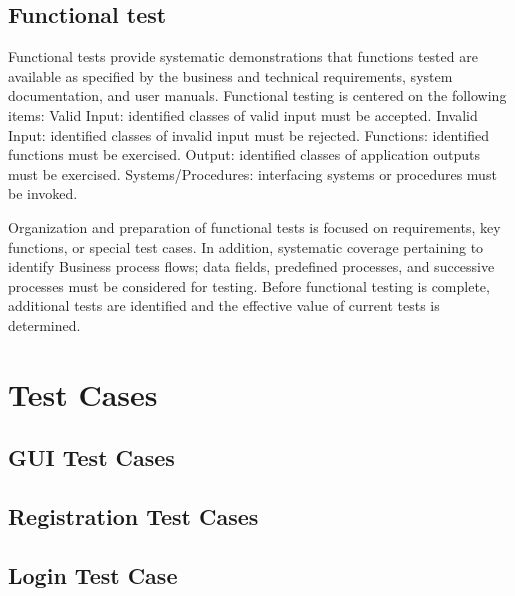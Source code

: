 \documentclass[12pt]{report}
\begin{document}
\subsection{ Functional test}
\justifying
\setlength{\parindent}{4em}
\setlength{\parskip}{0.5em}
\renewcommand{\baselinestretch}{1.5}
\normalsize

Functional tests provide systematic demonstrations that functions tested are available as 
specified by the business and technical requirements, system documentation, and user 
manuals. Functional testing is centered on the following items: Valid Input: identified classes 
of valid input must be accepted. Invalid Input: identified classes of invalid input must be 
rejected. Functions: identified functions must be exercised. Output: identified classes of 
application outputs must be exercised. Systems/Procedures: interfacing systems or procedures 
must be invoked.

Organization and preparation of functional tests is focused on requirements, key functions, or 
special test cases. In addition, systematic coverage pertaining to identify Business process 
flows; data fields, predefined processes, and successive processes must be considered for 
testing. Before functional testing is complete, additional tests are identified and the effective 
value of current tests is determined.




\clearpage


\centering
\section{Test Cases}
\justifying
\setlength{\parindent}{4em}
\setlength{\parskip}{0.5em}
\renewcommand{\baselinestretch}{1.5}
\normalsize
\subsection{GUI Test Cases}


\vspace{1cm}
\clearpage

\subsection{Registration Test Cases}


\vspace{1cm}
\clearpage

\subsection{Login Test Case}
\end{document}
